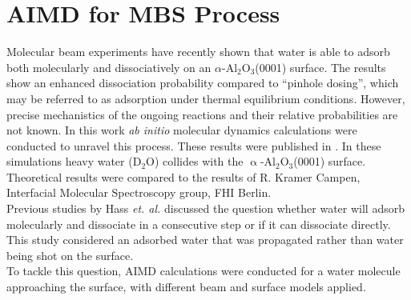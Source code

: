 \documentclass[11pt,DIV=13,BCOR=5mm,a4paper,headinclude]{scrbook}
\begin{document}
  
\section{AIMD for MBS Process}\label{sec_0001AIMD}
Molecular beam experiments have recently shown that water is able to adsorb both molecularly and dissociatively on an $\alpha$-Al$_{\text{2}}$O$_{\text{3}}$(0001) surface\cite{Wirth2014}.
The results show an enhanced dissociation probability compared to ``pinhole dosing'', which may be referred to as adsorption under thermal equilibrium conditions.
However, precise mechanistics of the ongoing reactions  and their relative probabilities are not known.
In this work \textit{ab initio} molecular dynamics calculations were conducted to unravel this process.
These results were published in \cite{Heiden0001_2018}.
In these simulations heavy water (D$_2$O) collides with the $\upalpha$-Al$_{\text{2}}$O$_{\text{3}}$(0001) surface.
Theoretical results were compared to the results of R. Kramer Campen, Interfacial Molecular Spectroscopy group, FHI Berlin.
\\
Previous studies by Hass \textit{et. al.}\cite{hass98,hass00} discussed the question whether water will adsorb molecularly and dissociate in a consecutive step or if it can dissociate directly.
This study considered an adsorbed water that was propagated rather than water being shot on the surface.
\\
To tackle this question, AIMD calculations were conducted for a water molecule approaching the surface, with different beam and surface models applied.
\end{document}
